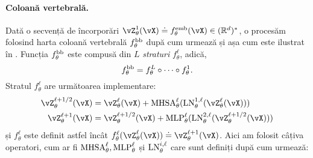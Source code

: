 \documentclass[../../book-main_ro.tex]{subfiles}
\begin{document}
\paragraph{Coloană vertebrală.} Dată o secvență de încorporări \(\vZ_{\theta}^{1}(\vX) \doteq f_{\theta}^{\emb}(\vX) \in (\R^{d})^{*}\), o procesăm folosind harta coloană vertebrală \(f_{\theta}^{\mathrm{bb}}\) după cum urmează și așa cum este ilustrat în . Funcția \(f_{\theta}^{\mathrm{bb}}\) este compusă din \(L\) \textit{straturi} \(f_{\theta}^{\ell}\), adică,
\begin{equation}
    f_{\theta}^{\mathrm{bb}} = f_{\theta}^{L} \circ \cdots \circ f_{\theta}^{1}.
\end{equation}
Stratul \(f_{\theta}^{\ell}\) are următoarea implementare:
\begin{align}\label{eq:vit-res-block}
    \vZ_{\theta}^{\ell + 1/2}(\vX)
    &= \vZ_{\theta}^{\ell}(\vX) + \MHSA_{\theta}^{\ell}(\LN_{\theta}^{1, \ell}(\vZ_{\theta}^{\ell}(\vX))) \\ 
    \vZ_{\theta}^{\ell + 1}(\vX)
    &= \vZ_{\theta}^{\ell + 1/2}(\vX) + \MLP_{\theta}^{\ell}(\LN_{\theta}^{2, \ell}(\vZ_{\theta}^{\ell + 1/2}(\vX)))
\end{align}
și \(f_{\theta}^{\ell}\) este definit astfel încât \(f_{\theta}^{\ell}(\vZ_{\theta}^{\ell}(\vX)) \doteq \vZ_{\theta}^{\ell + 1}(\vX)\). Aici am folosit câțiva operatori, cum ar fi \(\operatorname{MHSA}_{\theta}^{\ell}, \operatorname{MLP}_{\theta}^{\ell}\) și \(\operatorname{LN}_{\theta}^{i, \ell}\) care sunt definiți după cum urmează:
\end{document}
